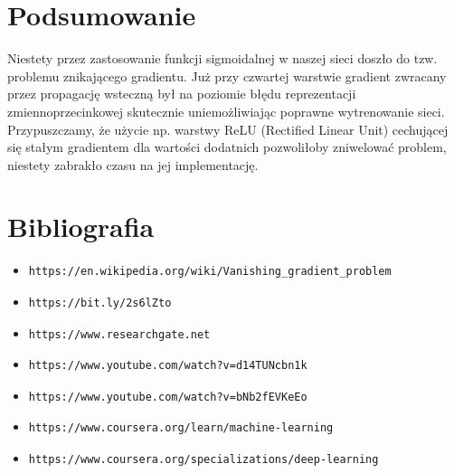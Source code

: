 \documentclass{article}
\begin{document}
\section{Podsumowanie}
Niestety przez zastosowanie funkcji sigmoidalnej w naszej sieci doszło do tzw. problemu znikającego gradientu. Już przy czwartej warstwie gradient zwracany przez propagację wsteczną był na poziomie błędu reprezentacji zmiennoprzecinkowej skutecznie uniemożliwiając poprawne wytrenowanie sieci. Przypuszczamy, że użycie np. warstwy ReLU (Rectified Linear Unit) cechującej się stałym gradientem dla wartości dodatnich pozwoliłoby zniwelować problem, niestety zabrakło czasu na jej implementację.
\section{Bibliografia}
\begin{itemize}
    \item\begin{verbatim}https://en.wikipedia.org/wiki/Vanishing_gradient_problem\end{verbatim}
    \item\begin{verbatim}https://bit.ly/2s6lZto\end{verbatim}
    \item\begin{verbatim}https://www.researchgate.net\end{verbatim}
    \item\begin{verbatim}https://www.youtube.com/watch?v=d14TUNcbn1k\end{verbatim}
    \item\begin{verbatim}https://www.youtube.com/watch?v=bNb2fEVKeEo\end{verbatim}
    \item\begin{verbatim}https://www.coursera.org/learn/machine-learning\end{verbatim}
    \item\begin{verbatim}https://www.coursera.org/specializations/deep-learning\end{verbatim}
    
\end{itemize}
\end{document}
